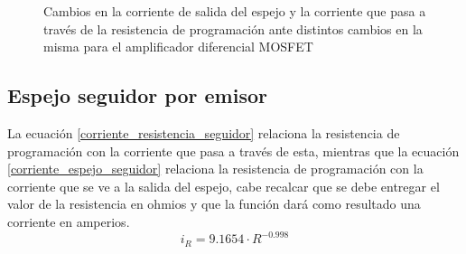 \begin{figure}[H]

\centering


\caption{Cambios en la corriente de salida del espejo y la corriente que pasa a través de la resistencia de programación ante distintos cambios en la misma para el amplificador diferencial MOSFET}
\label{espejodiferencialbjtfigura}

\end{figure}
\subsection{Espejo seguidor por emisor}
La ecuación \ref{corriente_resistencia_seguidor} relaciona la resistencia de programación con la corriente que pasa a través de esta, mientras que la ecuación \ref{corriente_espejo_seguidor} relaciona la resistencia de programación con la corriente que se ve a la salida del espejo, cabe recalcar que se debe entregar el valor de la resistencia en ohmios y que la función dará como resultado una corriente en amperios. \\

\begin{equation}\label{corriente_resistencia_seguidor}
i_R=9.1654\cdot R^{-0.998}
\end{equation}

